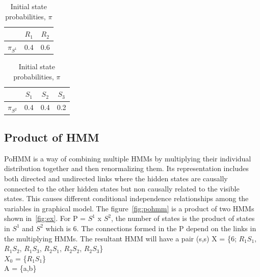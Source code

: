 \documentclass{sig-alternate}
\begin{document}
\begin{table}[h]
\centering
\begin{tabular}{ l | c | c }
&  $R_1$ & $R_2$ \\
\hline
$\pi_{S^{1}}$ & 0.4 & 0.6 \\
\end{tabular}
\quad
\begin{tabular}{ l | c | c | c}
&  $S_1$ & $S_2$ & $S_3$\\
\hline
$\pi_{S^{2}}$ & 0.4 & 0.4 & 0.2 \\
\end{tabular}
\caption{Initial state probabilities, $\pi$}
\label{table:pi}
\end{table}


\subsection{Product of HMM}
\label {sec:pohmm}
PoHMM is a way of combining multiple HMMs by multiplying their individual distribution together and then renormalizing them. Its representation includes both directed and undirected links where the hidden states are causally connected to the other hidden states but non causally related to the visible states. This causes different conditional independence relationships among the variables in graphical model. 
The figure~\ref{fig:pohmm} is a product of two HMMs shown in~\ref{fig:ex}. For  P = $S^1$ x $S^2$, the number of states is the product of states in $S^1$ and $S^2$ which is 6. The connections formed in the P depend on the links in the multiplying HMMs. The resultant HMM will have a pair (s,s)
X = \{6; $R_1$$S_1$, $R_1$$S_2$, $R_1$$S_3$, $R_2$$S_1$, $R_2$$S_2$, $R_2$$S_3$\} \\
$X_0$ = \{$R_1$$S_1$\} \\
A = \{a,b\} \\
\end{document}
